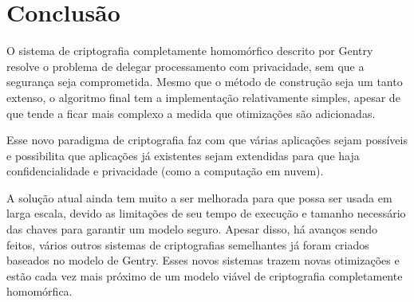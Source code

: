 \chapter{Conclusão}
\label{conclusao}
O sistema de criptografia completamente homomórfico descrito por Gentry resolve o problema de delegar processamento com privacidade, sem que a segurança seja comprometida. Mesmo que o método de construção seja um tanto extenso, o algoritmo final  tem a implementação relativamente simples, apesar de que tende a ficar mais complexo a medida que otimizações são adicionadas.

Esse novo paradigma de criptografia faz com que várias aplicações sejam possíveis e possibilita que aplicações já existentes sejam extendidas para que haja confidencialidade e privacidade (como a computação em nuvem).

A solução atual ainda tem muito a ser melhorada para que possa ser usada em larga escala, devido as limitações de seu tempo de execução e tamanho necessário das chaves para garantir um modelo seguro. Apesar disso, há avanços sendo feitos, vários outros sistemas de criptografias semelhantes já foram criados baseados no modelo de Gentry. Esses novos sistemas trazem novas otimizações e estão cada vez mais próximo de um modelo viável de criptografia completamente homomórfica.